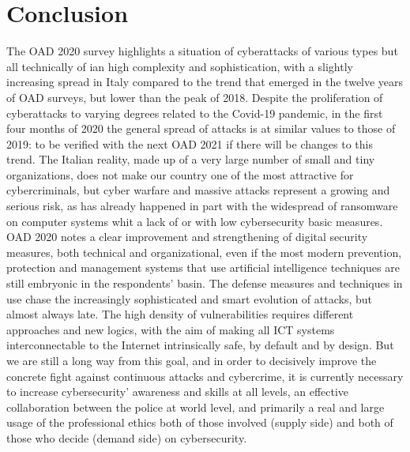 \documentclass{easychair}
\begin{document}
\section{Conclusion}\label{sec:Conclusion}

The OAD 2020 survey highlights a situation of cyberattacks of various types but all technically of ian high complexity and sophistication, with a slightly increasing 
spread  in Italy  compared to the trend that emerged in the twelve years of OAD surveys, but lower than the peak of 2018. Despite the proliferation of cyberattacks to varying 
degrees related to the Covid-19 pandemic, in the first four months of 2020 the general spread of attacks is at similar values to those of 2019: to be verified with the next OAD 2021
if there will be changes to this trend. The Italian reality, made up of a very large number of small and tiny organizations, does not make our country one of the most attractive for cybercriminals, but cyber warfare
and massive attacks represent a growing and serious risk, as has already happened in part with the widespread of ransomware on computer systems whit a lack of or  with low 
cybersecurity  basic measures. OAD 2020 notes a clear improvement and strengthening of digital security measures, both technical and organizational, even if the most modern 
prevention, protection and management systems that use artificial intelligence techniques are still embryonic  in the respondents' basin. The defense measures and techniques 
in use chase the increasingly sophisticated and smart evolution of attacks, but almost always late. The high density of vulnerabilities 
requires different approaches and new logics, with the aim of making all ICT systems interconnectable to the Internet intrinsically safe, by default and by design. But we are 
still a long way from this goal, and in order to decisively improve the concrete fight against continuous attacks and cybercrime, it is currently necessary to increase 
cybersecurity’ awareness and skills at all levels, an effective collaboration between the police at world level, and primarily a real and large usage of the professional ethics
 both of those involved (supply side) and both of those who decide (demand side) on cybersecurity.



\end{document}
